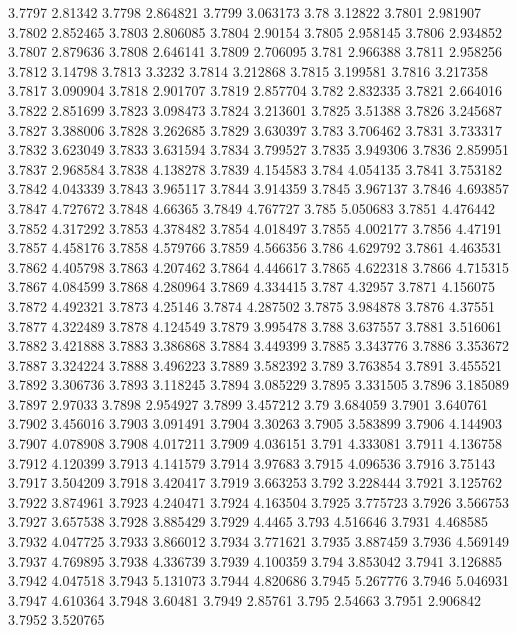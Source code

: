 3.7797  2.81342
3.7798  2.864821
3.7799  3.063173
3.78  3.12822
3.7801  2.981907
3.7802  2.852465
3.7803  2.806085
3.7804  2.90154
3.7805  2.958145
3.7806  2.934852
3.7807  2.879636
3.7808  2.646141
3.7809  2.706095
3.781  2.966388
3.7811  2.958256
3.7812  3.14798
3.7813  3.3232
3.7814  3.212868
3.7815  3.199581
3.7816  3.217358
3.7817  3.090904
3.7818  2.901707
3.7819  2.857704
3.782  2.832335
3.7821  2.664016
3.7822  2.851699
3.7823  3.098473
3.7824  3.213601
3.7825  3.51388
3.7826  3.245687
3.7827  3.388006
3.7828  3.262685
3.7829  3.630397
3.783  3.706462
3.7831  3.733317
3.7832  3.623049
3.7833  3.631594
3.7834  3.799527
3.7835  3.949306
3.7836  2.859951
3.7837  2.968584
3.7838  4.138278
3.7839  4.154583
3.784  4.054135
3.7841  3.753182
3.7842  4.043339
3.7843  3.965117
3.7844  3.914359
3.7845  3.967137
3.7846  4.693857
3.7847  4.727672
3.7848  4.66365
3.7849  4.767727
3.785  5.050683
3.7851  4.476442
3.7852  4.317292
3.7853  4.378482
3.7854  4.018497
3.7855  4.002177
3.7856  4.47191
3.7857  4.458176
3.7858  4.579766
3.7859  4.566356
3.786  4.629792
3.7861  4.463531
3.7862  4.405798
3.7863  4.207462
3.7864  4.446617
3.7865  4.622318
3.7866  4.715315
3.7867  4.084599
3.7868  4.280964
3.7869  4.334415
3.787  4.32957
3.7871  4.156075
3.7872  4.492321
3.7873  4.25146
3.7874  4.287502
3.7875  3.984878
3.7876  4.37551
3.7877  4.322489
3.7878  4.124549
3.7879  3.995478
3.788  3.637557
3.7881  3.516061
3.7882  3.421888
3.7883  3.386868
3.7884  3.449399
3.7885  3.343776
3.7886  3.353672
3.7887  3.324224
3.7888  3.496223
3.7889  3.582392
3.789  3.763854
3.7891  3.455521
3.7892  3.306736
3.7893  3.118245
3.7894  3.085229
3.7895  3.331505
3.7896  3.185089
3.7897  2.97033
3.7898  2.954927
3.7899  3.457212
3.79  3.684059
3.7901  3.640761
3.7902  3.456016
3.7903  3.091491
3.7904  3.30263
3.7905  3.583899
3.7906  4.144903
3.7907  4.078908
3.7908  4.017211
3.7909  4.036151
3.791  4.333081
3.7911  4.136758
3.7912  4.120399
3.7913  4.141579
3.7914  3.97683
3.7915  4.096536
3.7916  3.75143
3.7917  3.504209
3.7918  3.420417
3.7919  3.663253
3.792  3.228444
3.7921  3.125762
3.7922  3.874961
3.7923  4.240471
3.7924  4.163504
3.7925  3.775723
3.7926  3.566753
3.7927  3.657538
3.7928  3.885429
3.7929  4.4465
3.793  4.516646
3.7931  4.468585
3.7932  4.047725
3.7933  3.866012
3.7934  3.771621
3.7935  3.887459
3.7936  4.569149
3.7937  4.769895
3.7938  4.336739
3.7939  4.100359
3.794  3.853042
3.7941  3.126885
3.7942  4.047518
3.7943  5.131073
3.7944  4.820686
3.7945  5.267776
3.7946  5.046931
3.7947  4.610364
3.7948  3.60481
3.7949  2.85761
3.795  2.54663
3.7951  2.906842
3.7952  3.520765
